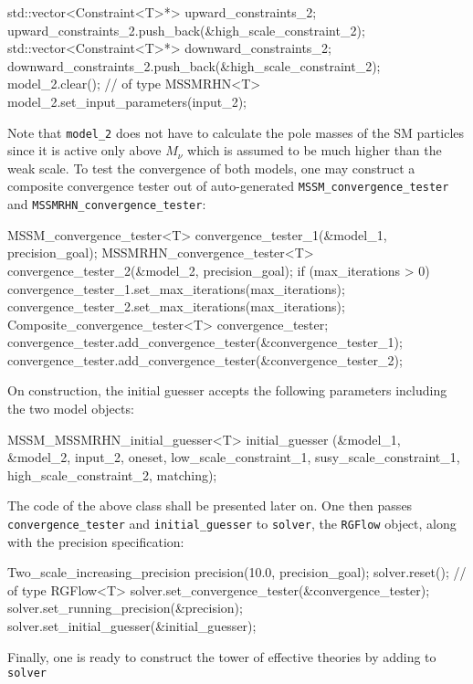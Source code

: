 \documentclass[final,3p,11pt,pdflatex]{elsarticle}
\newcommand{\code}[1]{\lstinline|#1|}  %
\begin{document}
\begin{numlstlisting}[name=SGrun,language=C++]
  std::vector<Constraint<T>*> upward_constraints_2;
  upward_constraints_2.push_back(&high_scale_constraint_2);
  std::vector<Constraint<T>*> downward_constraints_2;
  downward_constraints_2.push_back(&high_scale_constraint_2);
  model_2.clear();                 // of type MSSMRHN<T>
  model_2.set_input_parameters(input_2);
\end{numlstlisting}
Note that \code{model_2} does not have to calculate the pole masses of
the SM particles since it is active only above $M_\nu$
which is assumed to be much higher than the weak scale.
To test the convergence of both models,
one may construct a composite convergence tester
out of auto-generated
\code{MSSM_convergence_tester} and \code{MSSMRHN_convergence_tester}:
\begin{numlstlisting}[name=SGrun]
  MSSM_convergence_tester<T> convergence_tester_1(&model_1, precision_goal);
  MSSMRHN_convergence_tester<T> convergence_tester_2(&model_2, precision_goal);
  if (max_iterations > 0) {
    convergence_tester_1.set_max_iterations(max_iterations);
    convergence_tester_2.set_max_iterations(max_iterations);
  }
  Composite_convergence_tester<T> convergence_tester;
  convergence_tester.add_convergence_tester(&convergence_tester_1);
  convergence_tester.add_convergence_tester(&convergence_tester_2);
\end{numlstlisting}
On construction,
the initial guesser accepts the following parameters
including the two model objects:
\begin{numlstlisting}[name=SGrun]
  MSSM_MSSMRHN_initial_guesser<T> initial_guesser
    (&model_1, &model_2, input_2, oneset,
     low_scale_constraint_1, susy_scale_constraint_1, high_scale_constraint_2,
     matching);
\end{numlstlisting}
The code of the above class shall be presented later on.
One then passes
\code{convergence_tester} and \code{initial_guesser}
to \code{solver}, the \code{RGFlow} object,
along with the precision specification:
\begin{numlstlisting}[name=SGrun,language=C++]
  Two_scale_increasing_precision precision(10.0, precision_goal);
  solver.reset();                  // of type RGFlow<T>
  solver.set_convergence_tester(&convergence_tester);
  solver.set_running_precision(&precision);
  solver.set_initial_guesser(&initial_guesser);
\end{numlstlisting}
Finally,
one is ready to construct the tower of effective theories
by adding to \code{solver}
\end{document}

